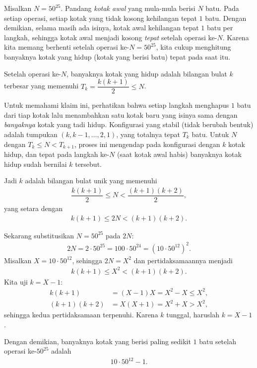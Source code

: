 \begin{solusi}

Misalkan $N = 50^{25}$. Pandang \emph{kotak awal} yang mula-mula berisi $N$ batu. Pada setiap operasi, setiap kotak yang tidak kosong kehilangan tepat $1$ batu. Dengan demikian, selama masih ada isinya, kotak awal kehilangan tepat $1$ batu per langkah, sehingga kotak awal menjadi kosong \emph{tepat} setelah operasi ke-$N$. Karena kita memang berhenti setelah operasi ke-$N = 50^{25}$, kita cukup menghitung banyaknya kotak yang hidup (kotak yang berisi batu) tepat pada saat itu.

\begin{claim*} 
    Setelah operasi ke-$N$, banyaknya kotak yang hidup adalah bilangan bulat $k$ terbesar yang memenuhi $T_k = \dfrac{k(k+1)}{2} \le N$.
\end{claim*}

Untuk memahami klaim ini, perhatikan bahwa setiap langkah menghapus $1$ batu dari tiap kotak lalu menambahkan satu kotak baru yang isinya sama dengan \emph{banyaknya} kotak yang tadi hidup. Konfigurasi yang stabil (tidak berubah bentuk) adalah tumpukan $ (k, k-1, \dots, 2, 1)$, yang totalnya tepat $T_k$ batu. Untuk $N$ dengan $T_k \le N < T_{k+1}$, proses ini mengendap pada konfigurasi dengan $k$ kotak hidup, dan tepat pada langkah ke-$N$ (saat kotak awal habis) banyaknya kotak hidup sudah bernilai $k$ tersebut.

Jadi $k$ adalah bilangan bulat unik yang memenuhi
\begin{align*}
    \dfrac{k(k+1)}{2} \le N < \dfrac{(k+1)(k+2)}{2},
\end{align*}
yang setara dengan
\begin{align*}
    k(k+1) \le 2N < (k+1)(k+2).
\end{align*}

Sekarang substitusikan $N = 50^{25}$ pada $2N$:
\begin{align*}
    2N = 2\cdot 50^{25} = 100 \cdot 50^{24} = \left(10\cdot 50^{12}\right)^2.
\end{align*}
Misalkan $X = 10\cdot 50^{12}$, sehingga $2N = X^2$ dan pertidaksamaannya menjadi
\begin{align*}
    k(k+1) \le X^2 < (k+1)(k+2).
\end{align*}
Kita uji $k = X-1$:
\begin{align*}
    k(k+1) &= (X-1)X = X^2 - X \le X^2, \\
    (k+1)(k+2) &= X(X+1) = X^2 + X > X^2,
\end{align*}
sehingga kedua pertidaksamaan terpenuhi. Karena $k$ tunggal, haruslah $k = X - 1$.

Dengan demikian, banyaknya kotak yang berisi paling sedikit $1$ batu setelah operasi ke-$50^{25}$ adalah
\begin{align*}
    \boxed{10\cdot 50^{12} - 1}.
\end{align*}
\end{solusi}